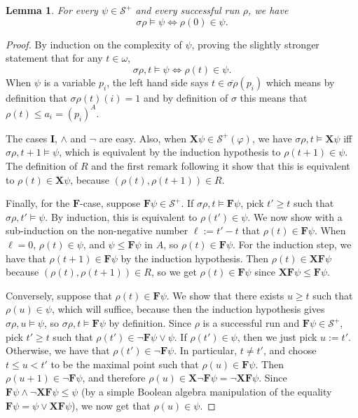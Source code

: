 \documentclass{article}
\newcommand{\X}{\mathbf{X}}
\newcommand{\F}{\mathbf{F}}
\newcommand{\I}{\mathbf{I}}
\renewcommand{\S}{\mathcal{S}}
\renewcommand{\phi}{\varphi}
\newtheorem{lemma}[theorem]{Lemma}
\begin{document}
\begin{lemma}\label{lem:automaton-semantics}
For every $\psi \in \S^+$ and every successful run $\rho$, we have 
\[ \sigma \rho \models \psi \iff \rho(0) \in \psi.\] 
\end{lemma}
%
\begin{proof}
By induction on the complexity of $\psi$, proving the slightly stronger
statement that for any $t \in \omega$, 
%
\[ \sigma \rho, t \models \psi \iff \rho(t) \in \psi. \]
%
When $\psi$ is a variable $p_i$, the left hand side says $t \in
\overline{\sigma\rho}(p_i)$ which means by definition that $\sigma\rho(t)(i) =
1$ and by definition of $\sigma$ this means that $\rho(t) \leq a_i = (p_i)^A$.

The cases $\I$, $\wedge$ and $\neg$ are easy. Also, when $\X \psi \in
\mathcal{S}^+(\phi)$, we have $\sigma\rho, t \models \X \psi$ iff $\sigma\rho, t
+ 1 \models \psi$, which is equivalent by the induction hypothesis to $\rho(t+1)
\in \psi$. The definition of $R$ and the first remark following it show that
this is equivalent to $\rho(t) \in \X \psi$, because $(\rho(t), \rho(t+1)) \in
R$.

Finally, for the $\F$-case, suppose $\F \psi \in \S^+$. If $\sigma \rho, t
\models \F \psi$, pick $t' \geq t$ such that $\sigma \rho, t' \models \psi$. By
induction, this is equivalent to $\rho(t') \in \psi$. We now show with a
sub-induction on  the non-negative number $\ell := t' - t$ that $\rho(t) \in \F
\psi$. When $\ell = 0$, $\rho(t) \in \psi$, and $\psi \leq \F\psi$ in $A$, so
$\rho(t) \in \F\psi$. For the induction step, we have that $\rho(t + 1) \in \F
\psi$ by the induction hypothesis. Then $\rho(t) \in \X\F\psi$ because
$(\rho(t), \rho(t+1)) \in R$, so we get $\rho(t) \in \F\psi$ since $\X \F \psi
\leq \F \psi$.

Conversely, suppose that $\rho(t) \in \F\psi$. We show that there exists $u \geq
t$ such that $\rho(u) \in \psi$, which will suffice, because then the induction
hypothesis gives $\sigma\rho, u \models \psi$, so $\sigma\rho, t \models \F
\psi$ by definition.  Since $\rho$ is a successful run and $\F \psi \in \S^+$,
pick $t' \geq t$ such that $\rho(t') \in \neg \F \psi \vee \psi$.  If $\rho(t')
\in \psi$, then we just pick $u := t'$. Otherwise, we have that $\rho(t') \in
\neg \F \psi$. In particular, $t \neq t'$, and choose $t \leq u < t'$ to be the
maximal point such that $\rho(u) \in \F \psi$. Then $\rho(u+1) \in \neg \F
\psi$, and therefore $\rho(u) \in \X \neg \F \psi = \neg \X \F \psi$. Since $\F
\psi \wedge \neg \X \F \psi \leq \psi$ (by a simple Boolean algebra manipulation
of the equality $\F \psi = \psi \vee \X \F \psi$), we now get that $\rho(u) \in
\psi$.  \end{proof}
\end{document}

